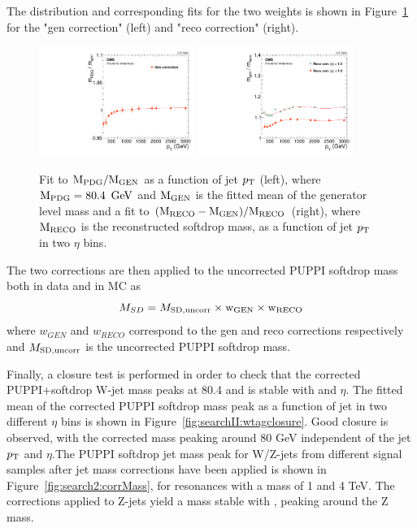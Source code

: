 The distribution and corresponding fits for the two weights is shown in Figure~\ref{fig:jmcfits} for the "gen correction" (left) and "reco correction" (right).
\begin{figure}[htbp]
\centering
\includegraphics[width=0.45\textwidth]{figures/analysis/search2/AN-16-235/plots/JMC_fit_gen.pdf}
\includegraphics[width=0.45\textwidth]{figures/analysis/search2/AN-16-235/plots/JMC_fit_reco.pdf}
\caption{Fit to $\rm{M_{PDG}/M_{GEN}}$ as a function of jet $p_{\mathrm{T}}$ (left), where $\rm{M_{PDG}}=80.4~\,\text{Ge\hspace{-.08em}V}$ and $\rm{M_{GEN}}$ is the fitted mean of the generator level mass and a fit to $\rm{(M_{RECO}-M_{GEN})/M_{RECO}}$ (right), where $\rm{M_{RECO}}$ is the reconstructed softdrop mass, as a function of jet $p_{\mathrm{T}}$ in two $\eta$ bins.}
\label{fig:jmcfits}
\end{figure}
The two corrections are then applied to the uncorrected PUPPI softdrop mass both in data and in MC as
\begin{equation}
M_{SD}=M_{\rm{SD, uncorr}} \times \rm{w_{GEN}} \times \rm{w_{RECO}}
\end{equation}
where $w_{GEN}$ and $w_{RECO}$ correspond to the gen and reco corrections respectively and $M_{\rm{SD, uncorr}}$ is the uncorrected PUPPI softdrop mass. \par
Finally, a closure test is performed in order to check that the corrected PUPPI+softdrop W-jet mass peaks at 80.4 \GeV and is stable with \PT and $\eta$. The fitted mean of the corrected PUPPI softdrop mass peak as a function of jet \PT in two different $\eta$ bins is shown in Figure~\ref{fig:searchII:wtagclosure}. Good closure is observed, with the corrected mass peaking around 80 GeV independent of the jet $p_{\mathrm{T}}$ and $\eta$.The PUPPI softdrop jet mass peak for W/Z-jets from different signal samples after jet mass corrections have been applied is shown in Figure~\ref{fig:search2:corrMass}, for resonances with a mass of 1 and 4 TeV. The corrections applied to Z-jets yield a mass stable with \PT, peaking around the Z mass. 
